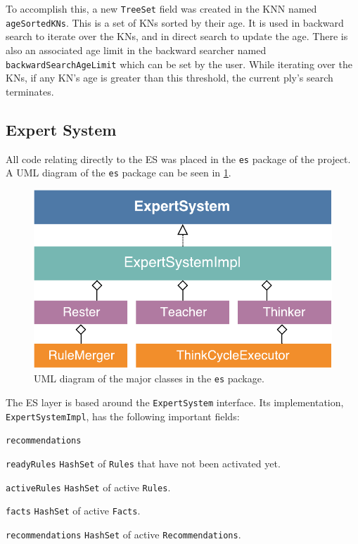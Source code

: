 \documentclass[titlepage,11pt]{article}
\newcommand{\code}[1]{\texttt{#1}}
\begin{document}
To accomplish this, a new \code{TreeSet} field was created in the KNN named \code{ageSortedKNs}. This is a set of KNs sorted by their age. It is used in backward search to iterate over the KNs, and in direct search to update the age. There is also an associated age limit in the backward searcher named \code{backwardSearchAgeLimit} which can be set by the user. While iterating over the KNs, if any KN's age is greater than this threshold, the current ply's search terminates.

\subsection{Expert System}

All code relating directly to the ES was placed in the \code{es} package of the project. A UML diagram of the \code{es} package can be seen in \cref{fig:uml_es}.

\begin{figure}[!htb]
	\includegraphics[width=\columnwidth]{figures/uml_es.pdf}
	\caption{UML diagram of the major classes in the \code{es} package.}
	\label{fig:uml_es}
\end{figure}

The ES layer is based around the \code{ExpertSystem} interface. Its implementation, \code{ExpertSystemImpl}, has the following important fields:

\begin{labeling}{\code{recommendations}}
	\item[\code{readyRules}] \code{HashSet} of \code{Rules} that have not been activated yet.
	\item[\code{activeRules}] \code{HashSet} of active \code{Rules}.
	\item[\code{facts}] \code{HashSet} of active \code{Facts}.
	\item[\code{recommendations}] \code{HashSet} of active \code{Recommendations}.
\end{labeling}
\end{document}
